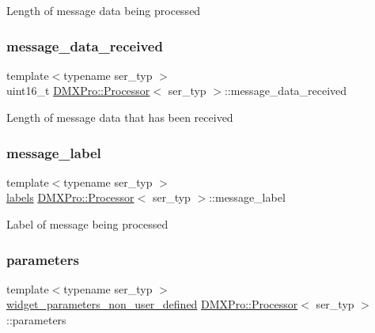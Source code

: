 Length of message data being processed \mbox{\label{classDMXPro_1_1Processor_a1ac91fd49f9650bc45ee1a1ad8e5f39f}} 
\subsubsection{\texorpdfstring{message\+\_\+data\+\_\+received}{message\_data\_received}}
{\footnotesize\ttfamily template$<$typename ser\+\_\+typ $>$ \\
uint16\+\_\+t \hyperlink{classDMXPro_1_1Processor}{D\+M\+X\+Pro\+::\+Processor}$<$ ser\+\_\+typ $>$\+::message\+\_\+data\+\_\+received\hspace{0.3cm}{\ttfamily [private]}}

Length of message data that has been received \mbox{\label{classDMXPro_1_1Processor_a7cda5025516aa2cdf2fdab4928652678}} 
\subsubsection{\texorpdfstring{message\+\_\+label}{message\_label}}
{\footnotesize\ttfamily template$<$typename ser\+\_\+typ $>$ \\
\hyperlink{namespaceDMXPro_a001319de95203723f1bd253fec3186cd}{labels} \hyperlink{classDMXPro_1_1Processor}{D\+M\+X\+Pro\+::\+Processor}$<$ ser\+\_\+typ $>$\+::message\+\_\+label\hspace{0.3cm}{\ttfamily [private]}}

Label of message being processed \mbox{\label{classDMXPro_1_1Processor_ab862c9d44d1abdcd029d0d47da7e928d}} 
\subsubsection{\texorpdfstring{parameters}{parameters}}
{\footnotesize\ttfamily template$<$typename ser\+\_\+typ $>$ \\
\hyperlink{structDMXPro_1_1widget__parameters__non__user__defined}{widget\+\_\+parameters\+\_\+non\+\_\+user\+\_\+defined} \hyperlink{classDMXPro_1_1Processor}{D\+M\+X\+Pro\+::\+Processor}$<$ ser\+\_\+typ $>$\+::parameters\hspace{0.3cm}{\ttfamily [private]}}

